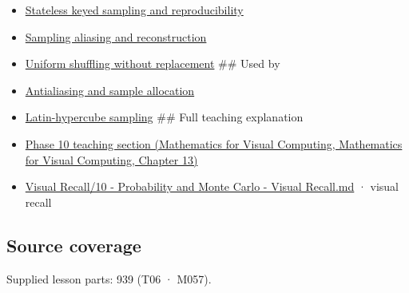 \begin{itemize}
\item
  \hyperref[appendix-daaf25bfd3a0]{Stateless keyed sampling and reproducibility}
\item
  \hyperref[appendix-6a7869dd79a6]{Sampling aliasing and reconstruction}
\item
  \hyperref[appendix-184fcc411663]{Uniform shuffling without replacement} \#\# Used by
\item
  \hyperref[appendix-4192b2bdd21e]{Antialiasing and sample allocation}
\item
  \hyperref[appendix-1c5e85693a06]{Latin-hypercube sampling} \#\# Full teaching explanation
\item
  \href{../02-Mathematics-for-Visual-Computing/main.pdf\#nameddest=02-foundations-ii-ch029-a-computer-produces-deterministic-pseudorandom-sequences}{Phase 10 teaching section (Mathematics for Visual Computing, Mathematics for Visual Computing, Chapter 13)}
\item
  \hyperref[appendix-cb5af353ef77]{Visual Recall/10 - Probability and Monte Carlo - Visual Recall.md} · visual recall
\end{itemize}

\subsection{Source coverage}\label{appendix-9f693ffd82bc-source-coverage}

Supplied lesson parts: 939 (T06 · M057).
